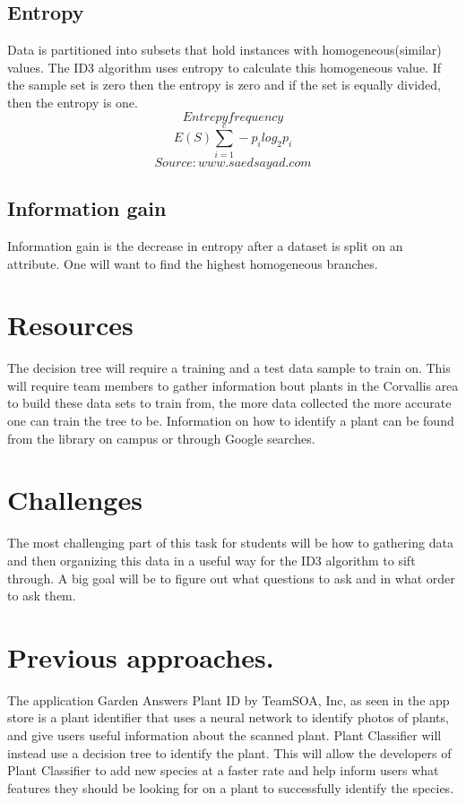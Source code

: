 \documentclass[a4paper]{article}
\begin{document}
\subsection{Entropy}
Data is partitioned into subsets that hold instances with homogeneous(similar) values. The ID3 algorithm uses entropy to calculate this homogeneous value. If the sample set is zero then the entropy is zero and if the set is equally divided, then the entropy is one. $$Entrepy frequency $$ $$E(S)\sum_{i=1}^{c} -p_{i} log_{2} p_{i}$$ $$Source: www.saedsayad.com$$
\subsection{Information gain}
Information gain is the decrease in entropy after a dataset is split on an attribute. One will want to find the highest homogeneous branches.
\section{Resources}
The decision tree will require a training and a test data sample to train on. This will require team members to gather information bout plants in the Corvallis area to build these data sets to train from, the more data collected the more accurate one can train the tree to be. Information on how to identify a plant can be found from the library on campus or through Google searches.
\section{Challenges}
The most challenging part of this task for students will be how to gathering data and then organizing this data in a useful way for the ID3 algorithm to sift through. A big goal will be to figure out what questions to ask and in what order to ask them.
\section{Previous approaches.}
The application Garden Answers Plant ID by TeamSOA, Inc, as seen in the app store is a plant identifier that uses a neural network to identify photos of plants, and give users useful information about the scanned plant. Plant Classifier will instead use a decision tree to identify the plant. This will allow the developers of Plant Classifier to add new species at a faster rate and help inform users what features they should be looking for on a plant to successfully identify the species.
\end{document}
